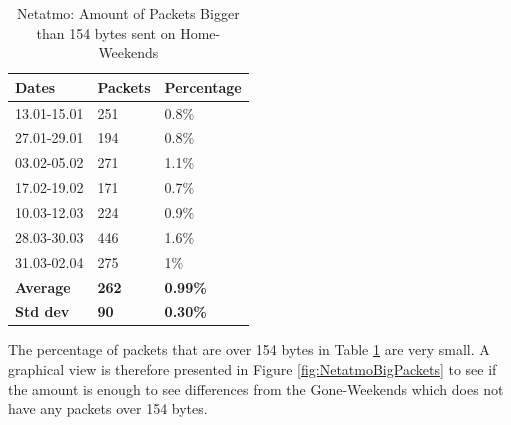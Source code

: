 \begin{table}[H]
    \centering
    \caption{Netatmo: Amount of Packets Bigger than 154 bytes sent on Home-Weekends}
    \begin{tabular}{|l|l|l|}
        \hline
        \textbf{Dates}   & \textbf{Packets} & \textbf{Percentage} \\ \hline
        13.01-15.01      & 251              & 0.8\%               \\ \hline
        27.01-29.01      & 194              & 0.8\%               \\ \hline
        03.02-05.02      & 271              & 1.1\%               \\ \hline
        17.02-19.02      & 171              & 0.7\%               \\ \hline
        10.03-12.03      & 224              & 0.9\%               \\ \hline
        28.03-30.03      & 446              & 1.6\%               \\ \hline
        31.03-02.04      & 275              & 1\%                 \\ \hline
        \textbf{Average} & \textbf{262}     & \textbf{0.99\%}     \\ \hline
        \textbf{Std dev} & \textbf{90}      & \textbf{0.30\%}     \\ \hline
    \end{tabular}
    \label{tab:NetatmoBigPackets}
\end{table}

The percentage of packets that are over 154 bytes in Table \ref{tab:NetatmoBigPackets} are very small. A graphical view is therefore presented in Figure \ref{fig:NetatmoBigPackets} to see if the amount is enough to see differences from the Gone-Weekends which does not have any packets over 154 bytes.

